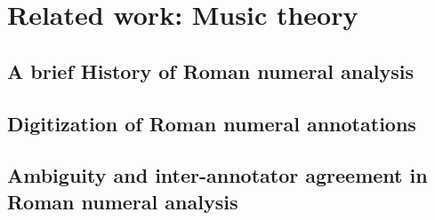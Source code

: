 \chapter{Related work: Music theory}
\label{chap:chap3}


\section{A brief History of Roman numeral analysis}
\section{Digitization of Roman numeral annotations}
\section{Ambiguity and inter-annotator agreement in Roman numeral analysis}


